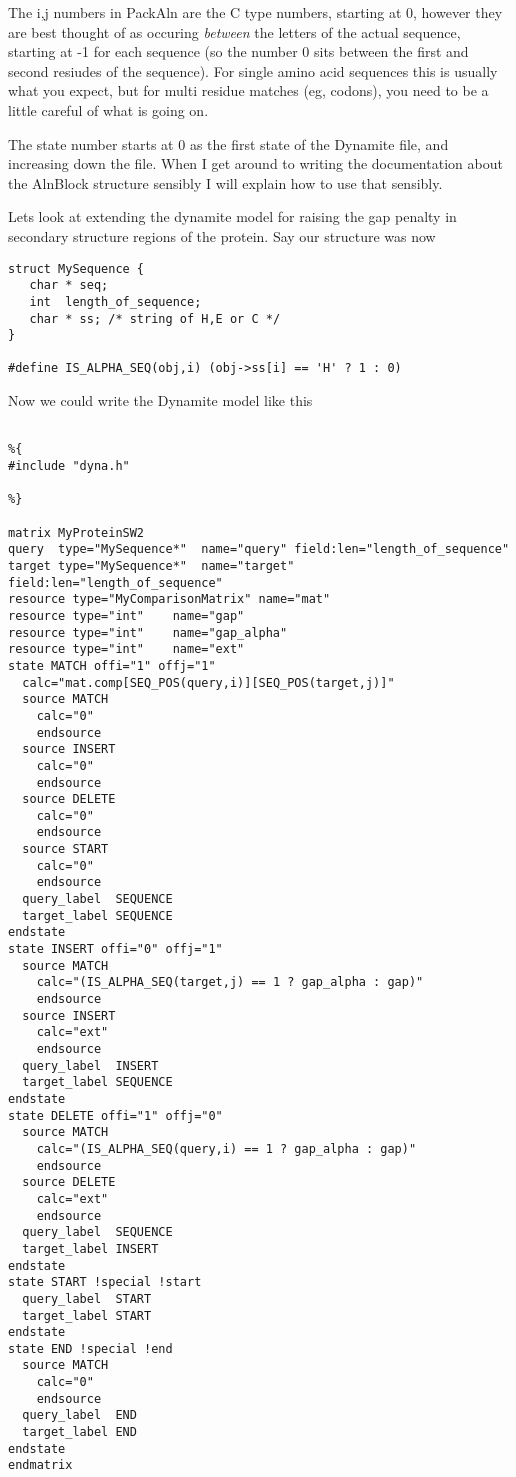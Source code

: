 The i,j numbers in PackAln are the C type numbers, starting
at 0, however they are best thought of as occuring \emph{between}
the letters of the actual sequence, starting at -1 for each sequence (so the
number 0 sits between the first and second resiudes of the sequence).
For single amino acid sequences this is usually what you expect, but
for multi residue matches (eg, codons), you need to be a little careful
of what is going on.

The state number starts at 0 as the first state of the Dynamite file,
and increasing down the file. When I get around to writing the documentation
about the AlnBlock structure sensibly I will explain how to use that sensibly.

Lets look at extending the dynamite model for raising the gap penalty in secondary
structure regions of the protein. Say our structure was now

\begin{verbatim}
struct MySequence {
   char * seq;
   int  length_of_sequence;
   char * ss; /* string of H,E or C */
}

#define IS_ALPHA_SEQ(obj,i) (obj->ss[i] == 'H' ? 1 : 0)
\end{verbatim}

Now we could write the Dynamite model like this

\begin{verbatim}

%{
#include "dyna.h"

%}

matrix MyProteinSW2
query  type="MySequence*"  name="query" field:len="length_of_sequence"  
target type="MySequence*"  name="target" field:len="length_of_sequence"
resource type="MyComparisonMatrix" name="mat"
resource type="int"    name="gap"
resource type="int"    name="gap_alpha"
resource type="int"    name="ext"
state MATCH offi="1" offj="1" 
  calc="mat.comp[SEQ_POS(query,i)][SEQ_POS(target,j)]"
  source MATCH
    calc="0"
    endsource
  source INSERT
    calc="0"
    endsource
  source DELETE
    calc="0"
    endsource
  source START
    calc="0"
    endsource
  query_label  SEQUENCE
  target_label SEQUENCE
endstate
state INSERT offi="0" offj="1"
  source MATCH
    calc="(IS_ALPHA_SEQ(target,j) == 1 ? gap_alpha : gap)"
    endsource
  source INSERT
    calc="ext"
    endsource
  query_label  INSERT
  target_label SEQUENCE
endstate
state DELETE offi="1" offj="0"
  source MATCH
    calc="(IS_ALPHA_SEQ(query,i) == 1 ? gap_alpha : gap)"
    endsource
  source DELETE
    calc="ext"
    endsource
  query_label  SEQUENCE
  target_label INSERT
endstate
state START !special !start
  query_label  START
  target_label START
endstate
state END !special !end
  source MATCH 
    calc="0"
    endsource
  query_label  END
  target_label END
endstate
endmatrix

\end{verbatim}


